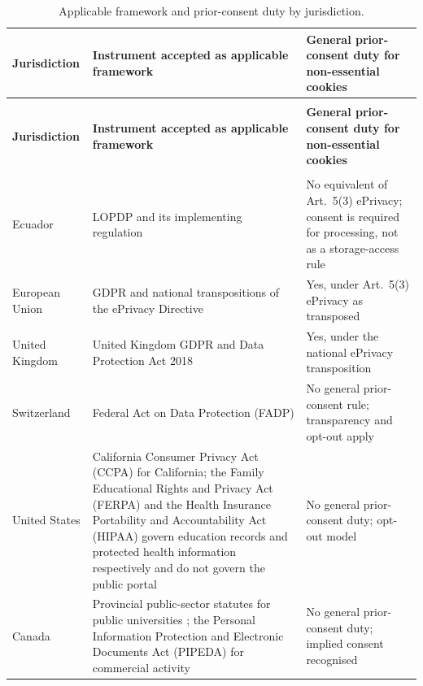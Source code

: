 \documentclass[pdflatex,sn-basic,Numbered,iicol]{sn-jnl}
\theoremstyle{thmstyleone}
\theoremstyle{thmstyletwo}
\theoremstyle{thmstylethree}
\begin{document}
\begin{appendices}
		\footnotesize
		\begin{longtable}{@{}>{\RaggedRight}p{2.4cm}>{\RaggedRight}p{5.5cm}>{\RaggedRight\arraybackslash}p{4.1cm}@{}}
			\caption{Applicable framework and prior-consent duty by jurisdiction.}\label{tab:mapeo}\\
			\toprule
			\textbf{Jurisdiction} & \textbf{Instrument accepted as applicable framework} & \textbf{General prior-consent duty for non-essential cookies} \\
			\midrule
			\endfirsthead
			\multicolumn{3}{c}{\textit{(Table~\ref{tab:mapeo}, continued)}}\\
			\toprule
			\textbf{Jurisdiction} & \textbf{Instrument accepted as applicable framework} & \textbf{General prior-consent duty for non-essential cookies} \\
			\midrule
			\endhead
			\midrule
			\multicolumn{3}{r}{\textit{Continued on next page}}\\
			\endfoot
			\bottomrule
			\endlastfoot
			Ecuador & LOPDP and its implementing regulation \citep{lopdp2021,reglamentolopdp2023} & No equivalent of Art.\ 5(3) ePrivacy; consent is required for processing, not as a storage-access rule \\
			\addlinespace
			European Union & GDPR \citep{gdpr2016} and national transpositions of the ePrivacy Directive \citep{eprivacy2002} & Yes, under Art.\ 5(3) ePrivacy as transposed \citep{edpb2024eprivacy} \\
			\addlinespace
			United Kingdom & United Kingdom GDPR and Data Protection Act 2018 \citep{ukdpa2018} & Yes, under the national ePrivacy transposition \\
			\addlinespace
			Switzerland & Federal Act on Data Protection (FADP) \citep{fadp_ch} & No general prior-consent rule; transparency and opt-out apply \\
			\addlinespace
			United States & California Consumer Privacy Act (CCPA) \citep{ccpa2018} for California; the Family Educational Rights and Privacy Act (FERPA) \citep{ferpa1974} and the Health Insurance Portability and Accountability Act (HIPAA) \citep{hipaa1996} govern education records and protected health information respectively and do not govern the public portal & No general prior-consent duty; opt-out model \\
			\addlinespace
			Canada & Provincial public-sector statutes for public universities \citep{fippa_on,fippa_bc,quebec_privacy}; the Personal Information Protection and Electronic Documents Act (PIPEDA) \citep{pipeda2000} for commercial activity & No general prior-consent duty; implied consent recognised \\

\end{longtable}
\end{appendices}
\end{document}
